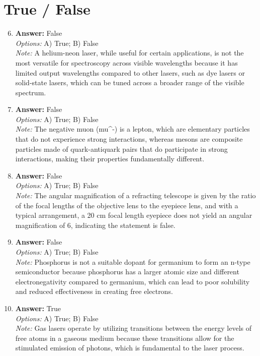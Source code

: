 \documentclass[12pt]{article}
\begin{document}
\section*{True / False}
\begin{enumerate}[label=\arabic*.]
\setcounter{enumi}{5}
\item \textbf{Answer:} False
\\ \textit{Options:} A) True; B) False
\\ \textit{Note:} A helium-neon laser, while useful for certain applications, is not the most versatile for spectroscopy across visible wavelengths because it has limited output wavelengths compared to other lasers, such as dye lasers or solid-state lasers, which can be tuned across a broader range of the visible spectrum.
\item \textbf{Answer:} False
\\ \textit{Options:} A) True; B) False
\\ \textit{Note:} The negative muon (mu^-) is a lepton, which are elementary particles that do not experience strong interactions, whereas mesons are composite particles made of quark-antiquark pairs that do participate in strong interactions, making their properties fundamentally different.
\item \textbf{Answer:} False
\\ \textit{Options:} A) True; B) False
\\ \textit{Note:} The angular magnification of a refracting telescope is given by the ratio of the focal lengths of the objective lens to the eyepiece lens, and with a typical arrangement, a 20 cm focal length eyepiece does not yield an angular magnification of 6, indicating the statement is false.
\item \textbf{Answer:} False
\\ \textit{Options:} A) True; B) False
\\ \textit{Note:} Phosphorus is not a suitable dopant for germanium to form an n-type semiconductor because phosphorus has a larger atomic size and different electronegativity compared to germanium, which can lead to poor solubility and reduced effectiveness in creating free electrons.
\item \textbf{Answer:} True
\\ \textit{Options:} A) True; B) False
\\ \textit{Note:} Gas lasers operate by utilizing transitions between the energy levels of free atoms in a gaseous medium because these transitions allow for the stimulated emission of photons, which is fundamental to the laser process.
\end{enumerate}
\end{document}
